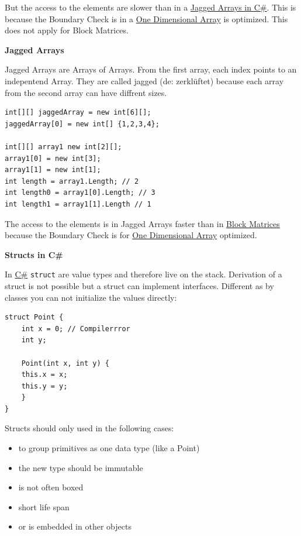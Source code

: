 \documentclass[11pt,twoside,landscape]{article}
\begin{document}
\begin{multicols}{3}
But the access to the elements are slower than in a \href{../../../roam/20211008083300-jagged_arrays_in_c.org}{Jagged Arrays in C\#}.
This is because the Boundary Check is in a \href{../../../roam/20211008083138-single_dimensional_arrays_in_c.org}{One Dimensional Array} is optimized.
This does not apply for Block Matrices. 

\textbf{Jagged Arrays}

Jagged Arrays are Arrays of Arrays.
From the first array, each index points to an indepentend Array.
They are called jagged (de: zerklüftet) because each array from the second array can have diffrent sizes.

\lstset{language=csharp,label= ,caption= ,captionpos=b,numbers=none}
\begin{lstlisting}
int[][] jaggedArray = new int[6][];
jaggedArray[0] = new int[] {1,2,3,4};

int[][] array1 new int[2][];
array1[0] = new int[3];
array1[1] = new int[1];
int length = array1.Length; // 2
int length0 = array1[0].Length; // 3
int length1 = array1[1].Length // 1
\end{lstlisting}

The access to the elements is in Jagged Arrays faster than in \href{../../../roam/20211008083241-multidimension_array_in_c.org}{Block Matrices} because the Boundary Check is for \href{../../../roam/20211008083138-single_dimensional_arrays_in_c.org}{One Dimensional Array} optimized.

\textbf{Structs in C\#}

In \href{../../../roam/20211003114158-c.org}{C\#} \texttt{struct} are value types and therefore live on the stack.
Derivation of a struct is not possible but a struct can implement interfaces.
Different as by classes you can not initialize the values directly:
\lstset{language=csharp,label= ,caption= ,captionpos=b,numbers=none}
\begin{lstlisting}
struct Point {
    int x = 0; // Compilerrror
    int y;

    Point(int x, int y) {
	this.x = x;
	this.y = y;
    }
}

\end{lstlisting}


Structs should only used in the following cases:
\begin{itemize}
\item to group primitives as one data type (like a Point)
\item the new type should be immutable
\item is not often boxed
\item short life span
\item or is embedded in other objects
\end{itemize}



\end{multicols}
\end{document}
